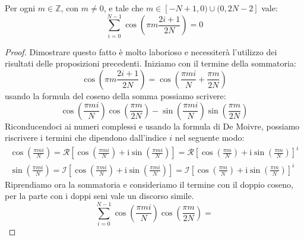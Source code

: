 \begin{proposizione}
    Per ogni $m\in \mathbb{Z}$, con $m \neq 0$, e tale che $m\in [-N + 1,0) \cup
            (0, 2N-2]$ vale:
    \begin{equation}
        \sum_{i=0}^{N-1} \cos\left(\pi m \frac{2i+1}{2N}\right) = 0
    \end{equation}
    \begin{proof}
        Dimostrare questo fatto è molto laborioso e necessiterà l'utilizzo dei
        risultati delle proposizioni precedenti. Iniziamo con il termine della
        sommatoria:
        \begin{equation*}
            \cos\left(\pi m \frac{2i+1}{2N}\right) = \cos\left(\frac{\pi mi}{N}
            + \frac{\pi m}{2N}\right)
        \end{equation*}
        usando la formula del coseno della somma possiamo scrivere:
        \begin{equation*}
            \cos\left(\frac{\pi mi}{N}\right)\cos\left(\frac{\pi m}{2N}\right) -
            \sin\left(\frac{\pi mi}{N}\right)\sin\left(\frac{\pi m}{2N}\right)
        \end{equation*}
        Riconducendoci ai numeri complessi e usando la formula di De Moivre,
        possiamo riscrivere i termini che dipendono dall'indice $i$ nel seguente
        modo:
        \begin{equation*}
            \begin{array}{l}
                \cos\left(\frac{\pi mi}{N}\right) = \mathcal{R} \left[\cos\left(
                    \frac{\pi mi}{N}\right) + \text{i} \sin\left(\frac{\pi mi}{N}
                    \right)\right] = \mathcal{R} \left[\cos\left(\frac{\pi m}{N}\right)
                + \text{i} \sin\left(\frac{\pi m}{N}\right)\right]^i \\
                \sin\left(\frac{\pi mi}{N}\right) = \mathcal{I} \left[\cos\left(
                    \frac{\pi mi}{N}\right) + \text{i} \sin\left(\frac{\pi mi}{N}
                    \right)\right] = \mathcal{I} \left[\cos\left(\frac{\pi m}{N}\right)
                    + \text{i} \sin\left(\frac{\pi m}{N}\right)\right]^i
            \end{array}
        \end{equation*}
        Riprendiamo ora la sommatoria e consideriamo il termine con il doppio
        coseno, per la parte con i doppi seni vale un discorso simile.
        \begin{equation*}
            \sum_{i=0}^{N-1} \cos\left(\frac{\pi mi}{N}\right)\cos\left(\frac{\pi m}{2N}\right) =

\end{equation*}
\end{proof}
\end{proposizione}
